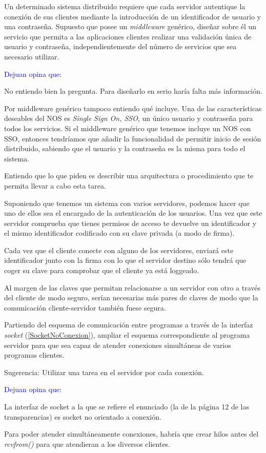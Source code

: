   \begin{problem}[5]
  Un determinado sistema distribuido requiere que cada servidor autentique
  la conexión de sus clientes mediante la introducción de un
  identificador de usuario y una contraseña. Supuesto que posee un
  \textit{middleware} genérico, diseñar sobre él un servicio que permita a las
aplicaciones clientes realizar una validación única de usuario y contraseña,
independientemente del número de servicios que sea necesario utilizar.
  \solution

\textcolor{blue}{Dejuan opina que:}


No entiendo bien la pregunta. Para diseñarlo en serio haría falta más información.

Por middleware genérico tampoco entiendo qué incluye. Una de las características deseables del NOS es \textit{Single Sign On, SSO}, un único usuario y contraseña para todos los servicios. Si el middleware genérico que tenemos incluye un NOS con SSO, entonces tendríamos que añadir la funcionalidad de permitir inicio de sesión distribuido, sabiendo que el usuario y la contraseña es la misma para todo el sistema.

\yoP

Entiendo que lo que piden es describir una arquitectura o procedimiento que te permita llevar a cabo esta tarea.

Suponiendo que tenemos un sistema con varios servidores, podemos hacer que uno de ellos sea el encargado de la autenticación de los usuarios. Una vez que este servidor comprueba que tienes permisos de acceso te devuelve un identificador y el mismo identificador codificado con su clave privada (a modo de firma).

Cada vez que el cliente conecte con alguno de los servidores, enviará este identificador junto con la firma con lo que el servidor destino sólo tendrá que coger su clave para comprobar que el cliente ya está loggeado.

Al margen de las claves que permitan relacionarse a un servidor con otro a través del cliente de modo seguro, serían necesarias más pares de claves de modo que la comunicación cliente-servidor también fuese segura.
  \end{problem}

  \begin{problem}[6]
  Partiendo del esquema de comunicación entre programas a través de la
interfaz \textit{socket} (\ref{SocketNoConexion}), ampliar el esquema correspondiente al programa servidor para que sea capaz de atender conexiones simultáneas de varios programas clientes.

Sugerencia: Utilizar una tarea en el servidor por cada conexión.
  \solution

\textcolor{blue}{Dejuan opina que:}

La interfaz de socket a la que se refiere el enunciado (la de la página 12 de las transparencias) es socket no orientado a conexión.

Para poder atender simultáneamente conexiones, habría que crear hilos antes del \textit{rcvfrom()} para que atendieran a los diversos clientes.


  \end{problem}

